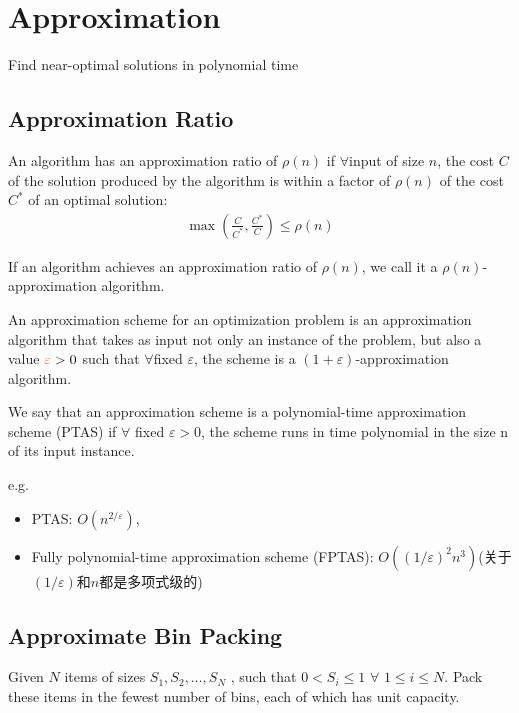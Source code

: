 \newpage
\section{Approximation}
Find near-optimal solutions in polynomial time

\subsection{Approximation Ratio}
\begin{definition}
    An algorithm has an \textcolor{light_blue}{approximation ratio} of  $\rho(n)$ if $\forall$input of size $n$, the cost $C$ of the solution produced by the algorithm is within a factor of $\rho(n)$ of the cost $C^*$ of an optimal solution:
    \begin{align*}
        \max\left( \frac{C}{C^*}, \frac{C^*}{C} \right)\le \rho(n)
    \end{align*}

    If an algorithm achieves an approximation ratio of $\rho(n)$, we call it a \textcolor{light_blue}{$\rho(n)$-approximation algorithm}.
\end{definition}

\begin{definition}
    An \textcolor{light_blue}{approximation scheme} for an optimization problem is an approximation algorithm that takes as input not only an instance of the problem, but also a value $\textcolor{light_red}{\varepsilon} > 0$ such that $\forall$fixed $\varepsilon$, the scheme is a \textcolor{light_red}{$(1+ \varepsilon)$-approximation algorithm}.

    We say that an approximation scheme is a \textcolor{light_blue}{polynomial-time approximation scheme (PTAS)} if $\forall$ fixed $\varepsilon > 0$, the scheme runs in time polynomial in the size n of its input instance.
\end{definition}
e.g. 
\begin{itemize}\small
    \item PTAS: $O(n^{2/\varepsilon})$, 
    \item Fully polynomial-time approximation scheme (FPTAS): $O((1/\varepsilon)^2n^3)$(关于$(1/\varepsilon)$和$n$都是多项式级的)
\end{itemize}
\subsection{Approximate Bin Packing}
Given $N$ items of sizes  $S_1 , S_2 , \dots, S_N$ , such that $0 < S_i \le 1$ $\forall$  $1 \le i \le N$.  Pack these items in the fewest number of bins, each of which has unit capacity.

